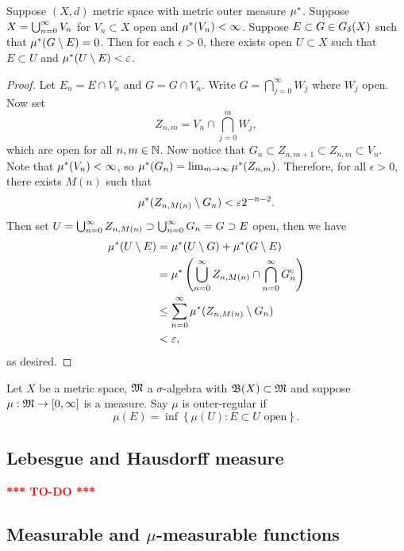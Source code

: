 \documentclass[a4paper]{article}
\newcommand{\TODO}{\textcolor{red}{\textbf{*** TO-DO ***}}}
\begin{document}
\begin{lemma}
Suppose $(X, d)$ metric space with metric outer measure
$\mu^*$. Suppose $X = \bigcup_{n=0}^\infty V_n$ for $V_n \subset X$ open and
$\mu^*(V_n) < \infty$. Suppose $E \subset G \in G_\delta(X)$ such that
$\mu^*(G \setminus E) = 0$. Then for each $\epsilon > 0$,
there exists open $U \subset X$ such that $E \subset U$
and $\mu^*(U \setminus E) < \varepsilon$.

\end{lemma}

\begin{proof}

Let $E_n = E \cap V_n$ and $G = G \cap V_n$. Write
$G = \bigcap_{j=0}^\infty W_j$ where $W_j$ open.
Now set
\[
Z_{n, m} = V_n \cap \bigcap_{j=0}^m W_j,
\]
which are open for all $n, m \in \mathbb{N}$.
Now notice that $G_n \subset Z_{n, m+1} \subset Z_{n,m}
\subset V_n$. Note that $\mu^*(V_n) < \infty$, so
$\mu^*(G_n) = \lim_{m \to \infty} \mu^*(Z_{n, m})$. Therefore,
for all $\epsilon > 0$, there exists $M(n)$ such that
\[
\mu^*(Z_{n, M(n)} \setminus G_n) < \varepsilon 2^{-n-2}.
\]
Then set $U = \bigcup_{n=0}^\infty Z_{n, M(n)} \supset \bigcup_{n=0}^\infty G_n = G
\supset E$ open, then we have
\[
\begin{aligned}
\mu^*(U \setminus E)
&= \mu^*(U \setminus G) + \mu^*(G \setminus E)  \\
&= \mu^* \left( \bigcup_{n=0}^\infty Z_{n, M(n)} \cap
\bigcap_{n=0}^\infty G_n^c \right) \\
&\leq \sum_{n=0}^\infty \mu^*(Z_{n, M(n)} \setminus G_n) \\
&< \varepsilon,
\end{aligned}
\]
as desired.

\end{proof}


\begin{defi}
  Let $X$ be a metric space, $\mathfrak{M}$ a $\sigma$-algebra
  with $\mathfrak{B}(X) \subset \mathfrak{M}$ and suppose $\mu: \mathfrak{M} \to [0, \infty]$
  is a measure. Say $\mu$ is outer-regular if
  \[
  \mu(E) = \inf \left\{ \mu(U) : E \subset U \text{ open} \right\}.
  \]
\end{defi}


\subsection{Lebesgue and Hausdorff measure}

\TODO

\subsection{Measurable and $\mu$-measurable functions}
\end{document}
